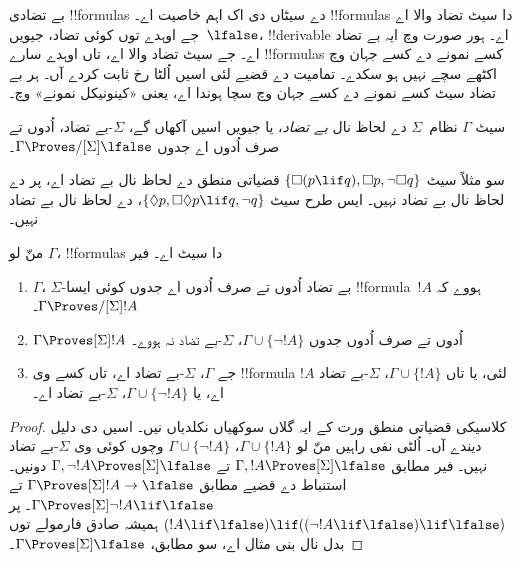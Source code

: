 \documentclass[../../../include/open-logic-section]{subfiles}
\begin{document}


بے تضادی !!{formula}s دے سیٹاں دی اک اہم خاصیت اے۔ !!{formula}s دا سیٹ تضاد والا اے جے اوہدے توں کوئی تضاد، جیویں~$\lfalse$، !!{derivable} اے۔ ہور صورت وچ ایہ بے تضاد اے۔ جے سیٹ تضاد والا اے، تاں اوہدے سارے !!{formula}s کسے نمونے دے کسے جہان وچ اکٹھے سچے نہیں ہو سکدے۔ تمامیت دے قضیے لئی اسیں اُلٹا رخ ثابت کردے آں۔ ہر بے تضاد سیٹ کسے نمونے دے کسے جہان وچ سچا ہوندا اے، یعنی «کینونیکل نمونے» وچ۔

\begin{defn}
  سیٹ $\Gamma$ نظام~$\Sigma$ دے لحاظ نال \emph{بے تضاد}، یا جیویں اسیں آکھاں گے، $\Sigma$-بے تضاد، اُدوں تے صرف اُدوں اے جدوں $\Gamma
  \Proves/[\Sigma] \lfalse$۔
\end{defn}

سو مثلاً سیٹ $\{ \Box(p \lif q), \Box p, \lnot\Box q \}$ قضیاتی منطق دے لحاظ نال بے تضاد اے، پر
 دے لحاظ نال بے تضاد نہیں۔ ایس طرح سیٹ $\{ \Diamond p, \Box\Diamond
p \lif q, \lnot q \}$،  دے لحاظ نال بے تضاد نہیں۔

\begin{prop}
  منّ لو $\Gamma$، !!{formula}s دا سیٹ اے۔ فیر
  \begin{enumerate}
  \item $\Gamma$، $\Sigma$-بے تضاد اُدوں تے صرف اُدوں اے جدوں کوئی ایسا !!{formula}~$!A$ ہووے کہ $\Gamma \Proves/[\Sigma]
    !A$۔
  \item {}%
    $\Gamma \Proves[\Sigma] !A$ اُدوں تے صرف اُدوں جدوں $\Gamma \cup \{
    \lnot!A \}$، $\Sigma$-بے تضاد نہ ہووے۔
  \item {}%
    جے $\Gamma$، $\Sigma$-بے تضاد اے، تاں کسے وی !!{formula}
    $!A$ لئی، یا تاں $\Gamma \cup \{ !A \}$،
    $\Sigma$-بے تضاد اے، یا $\Gamma \cup \{ \lnot!A \}$،
    $\Sigma$-بے تضاد اے۔
  \end{enumerate}
\end{prop}

\begin{proof}
  کلاسیکی قضیاتی منطق ورت کے ایہ گلاں سوکھیاں نکلدیاں نیں۔ اسیں  دی دلیل دیندے آں۔ اُلٹی نفی راہیں منّ لو $\Gamma \cup \{ !A \}$،
  $\Gamma \cup \{ \lnot!A \}$ وچوں کوئی وی $\Sigma$-بے تضاد نہیں۔ فیر
   مطابق $\Gamma, !A \Proves[\Sigma]
  \lfalse$ تے $\Gamma, \lnot !A \Proves[\Sigma] \lfalse$ دونیں۔ استنباط دے قضیے مطابق $\Gamma \Proves[\Sigma] !A \to \lfalse$ تے
  $\Gamma \Proves[\Sigma] \lnot!A \lif \lfalse$۔ پر $(!A \lif
  \lfalse) \lif ((\lnot!A \lif \lfalse) \lif \lfalse)$ ہمیشہ صادق فارمولے توں بدل نال بنی مثال اے، سو
   مطابق،
  $\Gamma \Proves[\Sigma] \lfalse$۔
\end{proof}
\end{document}

